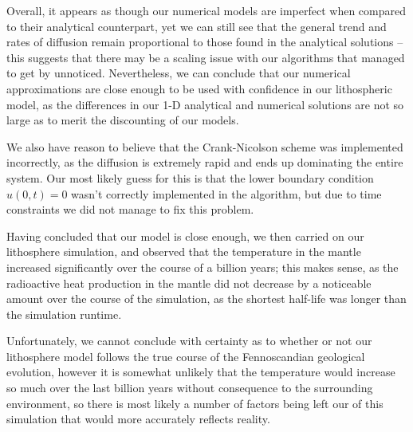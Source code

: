 \documentclass[a4paper,10pt,english]{article}
\begin{document}
Overall, it appears as though our numerical models are imperfect when compared to their analytical counterpart, yet we can still see that the general trend and rates of diffusion remain proportional to those found in the analytical solutions – this suggests that there may be a scaling issue with our algorithms that managed to get by unnoticed.  Nevertheless, we can conclude that our numerical approximations are close enough to be used with confidence in our lithospheric model, as the differences in our 1-D analytical and numerical solutions are not so large as to merit the discounting of our models.

We also have reason to believe that the Crank-Nicolson scheme was implemented incorrectly, as the diffusion is extremely rapid and ends up dominating the entire system. Our most likely guess for this is that the lower boundary condition $u(0,t)=0$ wasn't correctly implemented in the algorithm, but due to time constraints we did not manage to fix this problem. 

Having concluded that our model is close enough, we then carried on our lithosphere simulation, and observed that the temperature in the mantle increased significantly over the course of a billion years; this makes sense, as the radioactive heat production in the mantle did not decrease by a noticeable amount over the course of the simulation, as the shortest half-life was longer than the simulation runtime.

Unfortunately, we cannot conclude with certainty as to whether or not our lithosphere model follows the true course of the Fennoscandian geological evolution, however it is somewhat unlikely that the temperature would increase so much over the last billion years without consequence to the surrounding environment, so there is most likely a number of factors being left our of this simulation that would more accurately reflects reality.


{}

\end{document}
